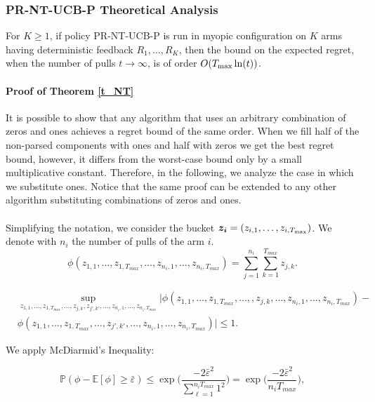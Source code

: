 \subsubsection{PR-NT-UCB-P Theoretical Analysis}

\begin{theorem}
	For $K \ge 1$, if policy PR-NT-UCB-P is run in myopic configuration on $K$ arms having deterministic feedback $R_1,\dots,R_K$, then the bound  on the expected regret, when the number of pulls $t \rightarrow \infty$, is of order $O(T_{\textnormal{max}}\ln(t))$.	
	\label{t_NT}
\end{theorem} 	


\paragraph{Proof of Theorem \ref{t_NT}}
It is possible to show that any algorithm that uses an arbitrary combination of zeros and ones achieves a regret bound of the same order. When we fill half of the non-parsed components with ones and half with zeros we get the best regret bound, however, it differs from the worst-case bound only by a small multiplicative constant. Therefore, in the following, we analyze the case in which we substitute ones. Notice that the
same proof can be extended to any other algorithm substituting combinations of zeros and ones.
\\\\
Simplifying the notation, we consider the bucket $\boldsymbol{z_i} = (z_{i,1},\dots,z_{i,T_{\textnormal{max}}})$. We denote with $n_i$ the number of pulls of the arm $i$.
\[ \phi(z_{1,1},\ldots,z_{1,T_{max}},\ldots,z_{n_i,1},\ldots,z_{n_i,T_{max}}) = \sum_{j=1}^{n_i}\sum_{k=1}^{T_{max}} z_{j,k}. 
\]

\begin{align}
	&\sup_{z_{1,1},\ldots,z_{1,T_{max}},\ldots,z_{j,k},z_{j',k'},\ldots,z_{n_i,1},\ldots,z_{n_i,T_{max}}}|\phi(z_{1,1},\ldots,z_{1,T_{max}},\ldots,,z_{j,k},\ldots,z_{n_i,1},\ldots,z_{n_i,T_{max}})-\\
	&\phi(z_{1,1},\ldots,z_{1,T_{max}},\ldots,z_{j',k'},\ldots,z_{n_i,1},\ldots,z_{n_i,T_{max}})|\le 1.
\end{align}

We apply McDiarmid's Inequality:

\[ \mathbb{P}(\phi-\mathbb{E}[\phi]\ge\bar{\varepsilon}) \le \exp\Bigg({\frac{-2\bar{\varepsilon}^2}{\sum_{\ell=1}^{n_iT_{max}}1^2}}\Bigg) = \exp\Bigg({\frac{-2\bar{\varepsilon}^2}{n_iT_{max}}}\Bigg),
\]

